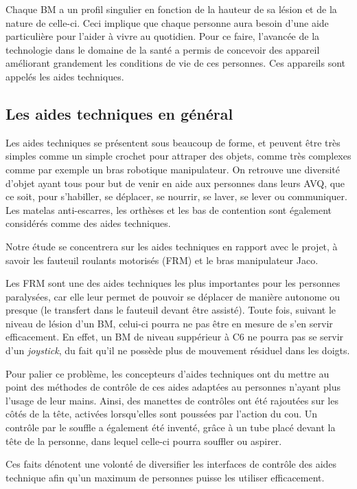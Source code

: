 \documentclass[letterpaper, twoside, 12pt, memoire, creativecommons, hyperref]{thETS}
\begin{document}
Chaque BM a un profil singulier en fonction de la hauteur de sa lésion et de la nature de celle-ci. Ceci implique que chaque personne aura besoin d'une aide particulière pour l'aider à vivre au quotidien. Pour ce faire,  l'avancée de la technologie dans le domaine de la santé a permis de concevoir des appareil améliorant grandement les conditions de vie de ces personnes. Ces appareils sont appelés les aides techniques. 

\subsection{Les aides techniques en général}

Les aides techniques se présentent sous beaucoup de forme, et peuvent être très simples comme un simple crochet pour attraper des objets, comme très complexes comme par exemple un bras robotique manipulateur. On retrouve une diversité d'objet ayant tous pour but de venir en aide aux personnes dans leurs AVQ, que ce soit, pour s'habiller, se déplacer, se nourrir, se laver, se lever ou communiquer. Les matelas anti-escarres, les orthèses et les bas de contention sont également considérés comme des aides techniques.

Notre étude se concentrera sur les aides techniques en rapport avec le projet, à savoir les fauteuil roulants motorisés (FRM) et le bras manipulateur Jaco.

Les FRM sont une des aides techniques les plus importantes pour les personnes paralysées, car elle leur permet de pouvoir se déplacer de manière autonome ou presque (le transfert dans le fauteuil devant être assisté). Toute fois, suivant le niveau de lésion d'un BM, celui-ci pourra ne pas être en mesure de s'en servir efficacement. En effet, un BM de niveau suppérieur à C6 ne pourra pas se servir d'un \textit{joystick}, du fait qu'il ne possède plus de mouvement résiduel dans les doigts. 

Pour palier ce problème, les concepteurs d'aides techniques ont du mettre au point des méthodes de contrôle de ces aides adaptées au personnes n'ayant plus l'usage de leur mains. Ainsi, des manettes de contrôles ont été rajoutées sur les côtés de la tête, activées lorsqu'elles sont poussées par l'action du cou. Un contrôle par le souffle a également été inventé, grâce à un tube placé devant la tête de la personne, dans lequel celle-ci pourra souffler ou aspirer.

Ces faits dénotent une volonté de diversifier les interfaces de contrôle des aides technique afin qu'un maximum de personnes puisse les utiliser efficacement.
\end{document}
